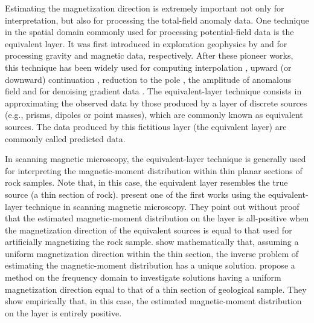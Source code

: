 Estimating the magnetization direction is extremely important not only for interpretation, 
but also for processing the total-field anomaly data. One technique in the spatial domain 
commonly used for processing potential-field data is the equivalent layer. It was first introduced 
in exploration geophysics by \cite{dampney1969} and \cite{emilia_massey_1974} for processing 
gravity and magnetic data, respectively. After these pioneer works, this technique has been widely 
used for computing interpolation \citep{cordell_1992, mendonca-silva_1994, barnes-lumley_2011, siqueira_etal_2017}, 
upward (or downward) continuation  \citep{cribb1976, hansen-miyazaki_1984, li-oldenburg_2010, mastellone_etal_2014}, reduction to the pole 
\citep{silva_1986, leao-silva_1989, guspi-novara_2009, oliveirajr-etal_2013}, the amplitude of 
anomalous field \citep{li_li_2014} and for denoising gradient data \citep{martinez_li_2016}. 
The equivalent-layer technique consists in approximating the observed data by those produced by a 
layer of discrete sources (e.g., prisms, dipoles or point masses), which are commonly known as 
equivalent sources. The data produced by this fictitious layer (the equivalent layer) are commonly
called predicted data.

In scanning magnetic microscopy, the equivalent-layer technique is generally used for interpreting 
the magnetic-moment distribution within thin planar sections of rock samples. Note that, in this case, 
the equivalent layer resembles the true source (a thin section of rock). 
\cite{weiss2007} present one of the first works using the equivalent-layer technique in scanning magnetic microscopy.
They point out without proof that the estimated magnetic-moment distribution on the layer is all-positive when  
the magnetization direction of the equivalent sources is equal to that used for artificially magnetizing the rock sample. 
\cite{baratchart2013} show mathematically that, assuming a uniform magnetization direction within the thin section, 
the inverse problem of estimating the magnetic-moment distribution has a unique solution. 
\cite{lima2013} propose a method on the frequency domain to investigate solutions having a uniform magnetization 
direction equal to that of a thin section of geological sample. They show empirically 
that, in this case, the estimated magnetic-moment distribution on the layer is entirely positive. 

